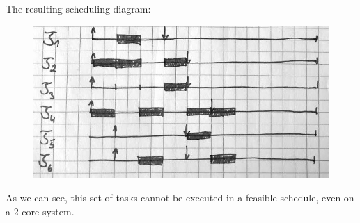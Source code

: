 \documentclass[12pt]{article}
\begin{document}
\begin{itemize}
\begin{itemize}
	The resulting scheduling diagram:\\
	\begin{figure}[h]
	\centering
	\includegraphics[scale = 2]{figures/c4_omega}\\
	\end{figure}
	
	As we can see, this set of tasks cannot be executed in a feasible schedule, even on a 2-core system.
	\end{itemize}
\end{itemize}
\end{document}
